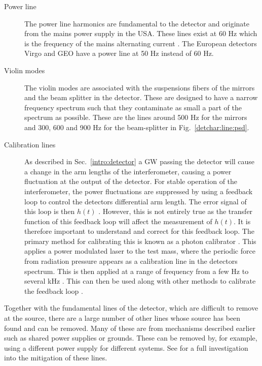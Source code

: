 \begin{description}
	\item[Power line] The power line harmonics are fundamental to the
	detector and originate from the mains power supply in the
	\gls{USA}. These lines exist at 60 Hz which is the frequency of the
	mains alternating current \citep{aasi2015CharacterizationLIGO}. The European
	detectors Virgo and GEO have a power line at 50 Hz instead of 60 Hz.
	
    \item[Violin modes] The violin modes are associated with the
	suspensions fibers of the mirrors and the beam splitter in the detector. These are
	designed to have a narrow frequency spectrum such that they contaminate as
	small a part of the spectrum as possible. These are the lines around 500 Hz for
	the mirrors and 300, 600 and 900 Hz for the beam-splitter \citep{GWOpen} in
	Fig.~\ref{detchar:line:psd}.
	
	\item[Calibration lines] As described in Sec.~\ref{intro:detector} a \gls{GW} passing the detector will cause a change in the arm lengths of the interferometer, causing a power fluctuation at the output of the detector. 
	For stable operation of the interferometer, the power fluctuations are suppressed by using a feedback loop to control the detectors differential arm length. The error signal of this loop is then $h(t)$ \citep{ligoscientificcollaboration2017CalibrationAdvanced}.
	However, this is not entirely true as the transfer function of this feedback loop will affect the measurement of $h(t)$.
	It is therefore important to understand and correct for this feedback loop.
	The primary method for calibrating this is known as a photon calibrator \citep{karki2016AdvancedLIGO}.
	This applies a power modulated laser to the test mass, where the periodic force from radiation pressure appears as a calibration line in the detectors spectrum.
	This is then applied at a range of frequency from a few Hz to several kHz \citep{karki2016AdvancedLIGO}.
	This can then be used along with other methods to calibrate the feedback loop \citep{ligoscientificcollaboration2017CalibrationAdvanced,coughlin2010NoiseLine,tuyenbayev2016ImprovingLIGO}.
 
\end{description}

Together with the fundamental lines of the detector, which are difficult to remove at the source, there are a large number of other lines whose source has been found and can be removed.  
Many of these are from mechanisms described
earlier such as shared power supplies or grounds. These can be removed by, for
example, using a different power supply for different systems. See
\citep{covas2018IdentificationMitigation} for a full investigation into the
mitigation of these lines.

